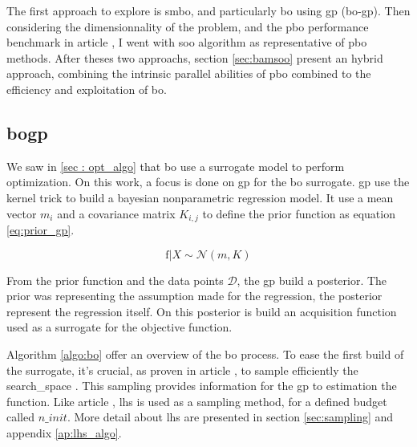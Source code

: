 The first approach to explore is \acrfull{smbo}, and particularly \acrfull{bo} using \acrfull{gp} (\acrshort{bo}-\acrshort{gp}). Then considering the dimensionnality of the problem, and the \acrshort{pbo} performance benchmark in article \cite{firmin_fractal-based_2022}, I went with \acrfull{soo} algorithm as representative of \acrshort{pbo} methods. After theses two approachs, section \ref{sec:bamsoo} present an hybrid approach, combining the intrinsic parallel abilities of \acrshort{pbo} combined to the efficiency and exploitation of \acrshort{bo}.

\subsection{\acrfull{bogp}}
\label{sec:bo}

We saw in \ref{sec : opt_algo} that \acrshort{bo} use a surrogate model to perform optimization. On this work, a focus is done on \acrfull{gp} for the \acrshort{bo} surrogate. \acrshort{gp} use the kernel trick to build a bayesian nonparametric regression model. It use a mean vector $m_i$ and a covariance matrix $K_{i,j}$ to define the prior function as equation \ref{eq:prior_gp}.

\begin{equation}
    \text{f} | X \sim  \mathcal N (m,K)
    \label{eq:prior_gp}
\end{equation}

From the prior function and the data points $\mathcal D$, the \acrshort{gp} build a posterior. The prior was representing the assumption made for the regression, the posterior represent the regression itself. On this posterior is build an acquisition function used as a surrogate for the objective function.

Algorithm \ref{algo:bo} offer an overview of the \acrshort{bo} process. To ease the first build of the surrogate, it's crucial, as proven in article \cite{wilson_efficiently_2020}, to sample efficiently the \gls{search_space} . This sampling provides information for the \acrfull{gp} to estimation the function. Like article \cite{borisut_adaptive_2023}, \acrfull{lhs}\cite{mckay_comparison_1979} is used as a sampling method, for a defined budget called $n\_init$. More detail about \acrshort{lhs} are presented in section \ref{sec:sampling} and appendix \ref{ap:lhs_algo}.

